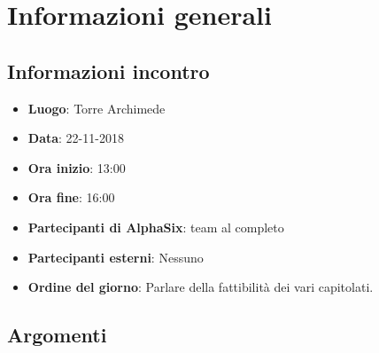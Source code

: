 \newcommand{\documento}{\VI}
\newcommand{\nomedocumentofisico}{VI\ 22-11-2018.pdf}
\newcommand{\redazione}{\LC}
\newcommand{\verifica}{\NC}
\newcommand{\approvazione}{\CV}
\newcommand{\versione}{1.0.0}
\newcommand{\uso}{Interno}
\newcommand{\destinateTo}{\gruppo}
\newcommand{\datacreazione}{25 novembre 2018}
\newcommand{\datamodifica}{26 novembre 2018}
\newcommand{\stato}{Approvato}

\def\TABELLE{false}	%
\def\FIGURE{false} 	%






    

    	
    
    \section{Informazioni generali}
		\subsection{Informazioni incontro}
			\begin{itemize}
				\item { \textbf{Luogo}:  Torre Archimede}
				\item { \textbf{Data}: 22-11-2018}
				\item { \textbf{Ora inizio}: 13:00}
				\item { \textbf{Ora fine}: 16:00}
				\item { \textbf{Partecipanti di AlphaSix}: team al completo}
				\item { \textbf{Partecipanti esterni}: Nessuno}
				\item { \textbf{Ordine del giorno}: Parlare della fattibilità dei vari capitolati.}
			\end{itemize}

        \subsection{Argomenti}
